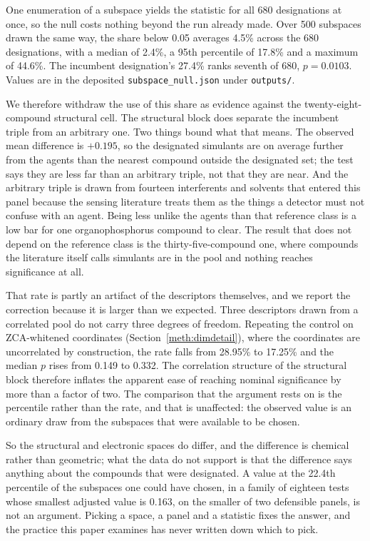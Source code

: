 \documentclass[11pt,a4paper]{article}
\begin{document}
One enumeration of a subspace yields the statistic for all 680 designations at
once, so the null costs nothing beyond the run already made. Over 500 subspaces
drawn the same way, the share below 0.05 averages 4.5\% across the 680
designations, with a median of 2.4\%, a 95th percentile of 17.8\% and a maximum
of 44.6\%. The incumbent designation's 27.4\% ranks seventh of 680, $p=0.0103$.
Values are in the deposited \texttt{subspace\_null.json} under
\texttt{outputs/}.

We therefore withdraw the use of this share as evidence against the
twenty-eight-compound structural cell. The structural block does separate the
incumbent triple from an arbitrary one. Two things bound what that means. The
observed mean difference is $+0.195$, so the designated simulants are on average
further from the agents than the nearest compound outside the designated set;
the test says they are less far than an arbitrary triple, not that they are
near. And the arbitrary triple is drawn from fourteen interferents and solvents
that entered this panel because the sensing literature treats them as the things
a detector must not confuse with an agent. Being less unlike the agents than
that reference class is a low bar for one organophosphorus compound to clear.
The result that does not depend on the reference class is the
thirty-five-compound one, where compounds the literature itself calls simulants
are in the pool and nothing reaches significance at all.

That rate is partly an artifact of the descriptors themselves, and we report the
correction because it is larger than we expected. Three descriptors drawn from a
correlated pool do not carry three degrees of freedom. Repeating the control on
ZCA-whitened coordinates (Section~\ref{meth:dimdetail}), where the coordinates are
uncorrelated by construction, the rate falls from 28.95\% to 17.25\% and the
median $p$ rises from 0.149 to 0.332. The correlation structure of the
structural block therefore inflates the apparent ease of reaching nominal
significance by more than a factor of two. The comparison that the argument
rests on is the percentile rather than the rate, and that is unaffected: the
observed value is an ordinary draw from the subspaces that were available to be
chosen.

So the structural and electronic spaces do differ, and the difference is
chemical rather than geometric; what the data do not support is that the
difference says anything about the compounds that were designated. A value at
the 22.4th percentile of the subspaces one could have chosen, in a family of
eighteen tests whose smallest adjusted value is 0.163, on the smaller of two
defensible panels, is not an argument. Picking a space, a panel and a statistic
fixes the answer, and the practice this paper examines has never written down
which to pick.
\end{document}
